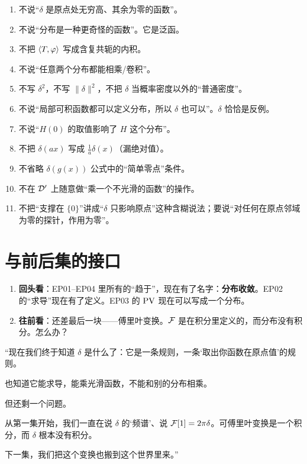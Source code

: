 \begin{warnbox}[逐条对照]
\begin{enumerate}[leftmargin=1.6em,itemsep=0.28em]
\item 不说“$\delta$ 是原点处无穷高、其余为零的函数”。
\item 不说“分布是一种更奇怪的函数”。它是泛函。
\item 不把 $\langle T,\varphi\rangle$ 写成含复共轭的内积。
\item 不说“任意两个分布都能相乘/卷积”。
\item 不写 $\delta^{2}$，不写 $\|\delta\|^{2}$，不把 $\delta$ 当概率密度以外的“普通密度”。
\item 不说“局部可积函数都可以定义分布，所以 $\delta$ 也可以”。$\delta$ 恰恰是反例。
\item 不说“$H(0)$ 的取值影响了 $H$ 这个分布”。
\item 不把 $\delta(ax)$ 写成 $\frac1a\delta(x)$（漏绝对值）。
\item 不省略 $\delta(g(x))$ 公式中的“简单零点”条件。
\item 不在 $\mathcal{D}'$ 上随意做“乘一个不光滑的函数”的操作。
\item 不把“支撑在 $\{0\}$”讲成“$\delta$ 只影响原点”这种含糊说法；要说“对任何在原点邻域为零的探针，作用为零”。
\end{enumerate}
\end{warnbox}

\section{与前后集的接口}

\begin{enumerate}[leftmargin=2em,itemsep=0.45em]
\item \textbf{回头看}：EP01--EP04 里所有的“趋于”，现在有了名字：\textbf{分布收敛}。EP02 的“求导”现在有了定义。EP03 的 $\operatorname{PV}$ 现在可以写成一个分布。
\item \textbf{往前看}：还差最后一块——傅里叶变换。$\mathcal{F}$ 是在积分里定义的，而分布没有积分。怎么办？
\end{enumerate}

\begin{scriptbox}[最后 30 秒的旁白骨架]
“现在我们终于知道 $\delta$ 是什么了：它是一条规则，一条‘取出你函数在原点值’的规则。

也知道它能求导，能乘光滑函数，不能和别的分布相乘。

但还剩一个问题。

从第一集开始，我们一直在说 $\delta$ 的‘频谱’、说 $\mathcal{F}[1]=2\pi\delta$。可傅里叶变换是一个积分，而 $\delta$ 根本没有积分。

下一集，我们把这个变换也搬到这个世界里来。”
\end{scriptbox}


